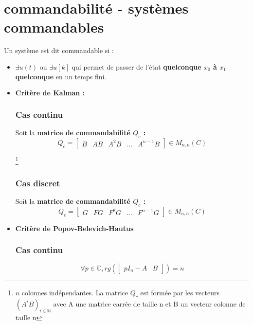 {{{{{{\section{commandabilité - systèmes commandables}
\large{Un système est dit commandable si :}
\begin{itemize}
    \item $\exists u(t)$ ou $\exists u[k]$ qui permet de passer de l'état \textbf{quelconque $x_{0}$ à $x_{1}$ quelconque} en un temps fini.
    \item \textbf{\large{Critère de Kalman : }}
        \subsubsection{Cas continu}
        \large{Soit la \textbf{matrice de commandabilité $Q_{c}$ :}}
            \[
            Q_{c} =
            \begin{bmatrix}
                B & AB & A^{2}B & ... & A^{n-1}B
            \end{bmatrix}
            \in M_{n,n}(C)
            \]
        \begin{center}
            \footnote{$n$ colonnes indépendantes. La matrice $Q_{c}$ est formée par les vecteurs $(A^{i}B)_{i \in \mathbb{N}}$ avec A une matrice carrée de taille n et B un vecteur colonne de taille n}
        \end{center}
        \subsubsection{Cas discret}
        \large{Soit la \textbf{matrice de commandabilité $Q_{c}$ :}}
        \[
        Q_{c} =
        \begin{bmatrix}
            G & FG & F^{2}G & ... & F^{n-1}G
        \end{bmatrix}
        \in M_{n,n}(C)
        \]
        \begin{center}
        \end{center}
    \item  \textbf{\large{Critère de Popov-Belevich-Hautus}}
        \subsubsection{Cas continu}
        \begin{center}
            \[
                \forall p \in \mathbb{C}, 
                rg(
                \begin{bmatrix}
                    pI_{n} - A & B
                \end{bmatrix}
                ) = n
            \]
        \end{center}

\end{itemize}}}}}}}
